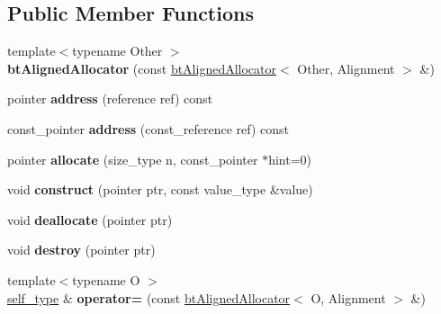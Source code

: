 \subsection*{Public Member Functions}
\begin{DoxyCompactItemize}
\item 
\mbox{\label{classbtAlignedAllocator_a8b129ab9ee2c6b8f638714913f5ac7a6}} 
{\footnotesize template$<$typename Other $>$ }\\{\bfseries bt\+Aligned\+Allocator} (const \hyperlink{classbtAlignedAllocator}{bt\+Aligned\+Allocator}$<$ Other, Alignment $>$ \&)
\item 
\mbox{\label{classbtAlignedAllocator_adaf5f8601f0b27ec5fe962ba35e5b6ff}} 
pointer {\bfseries address} (reference ref) const
\item 
\mbox{\label{classbtAlignedAllocator_a85187907179eadeb9907902ba7ee371a}} 
const\+\_\+pointer {\bfseries address} (const\+\_\+reference ref) const
\item 
\mbox{\label{classbtAlignedAllocator_a5b14474126ff00cd364dfb74304ec6c3}} 
pointer {\bfseries allocate} (size\+\_\+type n, const\+\_\+pointer $\ast$hint=0)
\item 
\mbox{\label{classbtAlignedAllocator_afdb40058534d13fed3fddade2939bd8e}} 
void {\bfseries construct} (pointer ptr, const value\+\_\+type \&value)
\item 
\mbox{\label{classbtAlignedAllocator_a9aa2ce10c6b68eb249116f8712008724}} 
void {\bfseries deallocate} (pointer ptr)
\item 
\mbox{\label{classbtAlignedAllocator_a8570a358258bc64869f0effd8405b69b}} 
void {\bfseries destroy} (pointer ptr)
\item 
\mbox{\label{classbtAlignedAllocator_a5366e980346aa0b85befd8ffecdffb9d}} 
{\footnotesize template$<$typename O $>$ }\\\hyperlink{classbtAlignedAllocator}{self\+\_\+type} \& {\bfseries operator=} (const \hyperlink{classbtAlignedAllocator}{bt\+Aligned\+Allocator}$<$ O, Alignment $>$ \&)

\end{DoxyCompactItemize}
